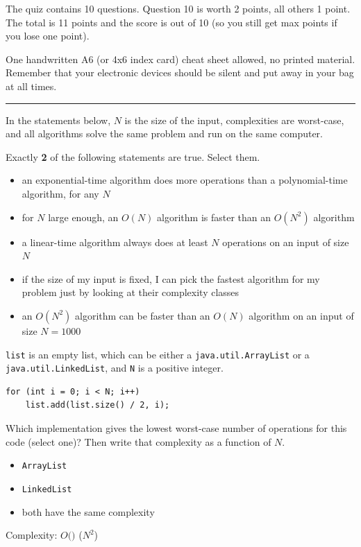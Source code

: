 \fullname

The quiz contains 10 questions. Question 10 is worth 2 points, all others 1 point. The total is 11 points and the score is out of 10 (so you still get max points if you lose one point).

One handwritten A6 (or 4x6 index card) cheat sheet allowed, no printed material.
Remember that your electronic devices should be silent and put away in your bag at all times.

\bigskip
\begin{center}\rule{0.4\linewidth}{0.4pt}\end{center}
\bigskip

\begin{question}
In the statements below, $N$ is the size of the input, complexities are worst-case, and all algorithms solve the same problem and run on the same computer.

Exactly \textbf{2} of the following statements are true. Select them.
\begin{itemize}[leftmargin=2em,itemsep=1pt,topsep=2pt]
\item[\cb{0}] an exponential-time algorithm does more operations than a polynomial-time algorithm, for any $N$
\item[\cb{1}] for $N$ large enough, an $O(N)$ algorithm is faster than an $O(N^2)$ algorithm
\item[\cb{0}] a linear-time algorithm always does at least $N$ operations on an input of size $N$
\item[\cb{0}] if the size of my input is fixed, I can pick the fastest algorithm for my problem just by looking at their complexity classes
\item[\cb{1}] an $O(N^2)$ algorithm can be faster than an $O(N)$ algorithm on an input of size $N = 1000$
\end{itemize}
\end{question}

\begin{question}
\lstinline|list| is an empty list, which can be either a \lstinline|java.util.ArrayList| or a \lstinline|java.util.LinkedList|, and \lstinline|N| is a positive integer.

\begin{lstlisting}
for (int i = 0; i < N; i++)
    list.add(list.size() / 2, i);
\end{lstlisting}

Which implementation gives the lowest worst-case number of operations for this code (select one)? Then write that complexity as a function of $N$.

\begin{itemize}[leftmargin=2em,itemsep=1pt,topsep=2pt]
\item[\cb{0}] \lstinline|ArrayList|
\item[\cb{0}] \lstinline|LinkedList|
\item[\cb{1}] both have the same complexity
\end{itemize}

Complexity: $O($\underline{\hspace{1in}}$)$ \ifanswers ($N^2$)\fi
\end{question}

